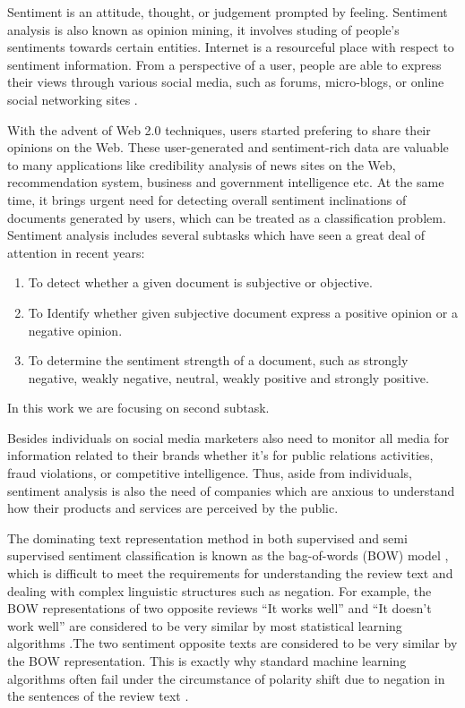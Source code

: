 \documentclass[oneside,a4paper,12pt]{pictreport}
\begin{document}
\par Sentiment is an attitude, thought, or judgement prompted by feeling. Sentiment analysis 
is also known as opinion mining, it involves studing of people’s sentiments towards 
certain entities. Internet is a resourceful place with respect to sentiment information. From a
perspective of a user, people are able to express their views through various social media,
such as forums, micro-blogs, or online social networking sites \cite{pang2008}.

\par With the advent of Web 2.0 techniques,
users started prefering to share their opinions on the Web. These user-generated and 
sentiment-rich data are valuable to many applications like 
credibility analysis of news sites on the Web, recommendation system, business and 
government intelligence etc. At the same time, it brings
urgent need for detecting overall sentiment inclinations of
documents generated by users, which can be treated as a
classification problem. Sentiment analysis includes several
subtasks  which have seen a great deal of attention in recent years:
\begin{enumerate}
 \item To detect whether a given document is subjective or objective.
  \item To Identify whether given subjective document express a positive opinion or a negative opinion.
  \item To determine the sentiment strength of a document,
such as strongly negative, weakly negative, neutral, weakly
positive and strongly positive.
\end{enumerate}

In this work we are focusing on second subtask.

\par Besides individuals on social media marketers also need to monitor all media for information related to their brands
whether it’s for public relations activities, fraud violations, or competitive intelligence.
Thus, aside from individuals, sentiment analysis is also the need of companies which are anxious to understand how
their products and services are perceived by the public.

\par The dominating text representation method in
both supervised and 
semi supervised sentiment
classification is known as the bag-of-words (BOW)
model \cite{pang}, which is difficult to meet the requirements
for understanding the review text and dealing with
complex linguistic structures such as negation. For
example, the BOW representations of two opposite
reviews ``It works well'' and ``It doesn't work well''
are considered to be very similar by most statistical
learning algorithms \cite{yahoo}.The two sentiment opposite texts are considered to be very similar by the
BOW representation. This is exactly why standard machine learning algorithms often
fail under the circumstance of polarity shift due to negation in the sentences of the review text \cite{contrast} \cite{xiaOriginal}.
\end{document}
